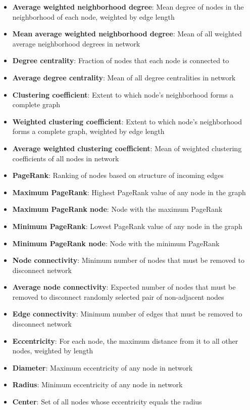 \documentclass[12pt, letterpaper]{article}
\begin{document}
\begin{itemize}
		\item \textbf{Average weighted neighborhood degree}: Mean degree of nodes in the neighborhood of each node, weighted by edge length
		\item \textbf{Mean average weighted neighborhood degree}: Mean of all weighted average neighborhood degrees in network
		\item \textbf{Degree centrality}: Fraction of nodes that each node is connected to
		\item \textbf{Average degree centrality}: Mean of all degree centralities in network
		\item \textbf{Clustering coefficient}: Extent to which node's neighborhood forms a complete graph
		\item \textbf{Weighted clustering coefficient}: Extent to which node's neighborhood forms a complete graph, weighted by edge length
		\item \textbf{Average weighted clustering coefficient}: Mean of weighted clustering coefficients of all nodes in network
		\item \textbf{PageRank}: Ranking of nodes based on structure of incoming edges
		\item \textbf{Maximum PageRank}: Highest PageRank value of any node in the graph
		\item \textbf{Maximum PageRank node}: Node with the maximum PageRank
		\item \textbf{Minimum PageRank}: Lowest PageRank value of any node in the graph
		\item \textbf{Minimum PageRank node}: Node with the minimum PageRank
		\item \textbf{Node connectivity}: Minimum number of nodes that must be removed to disconnect network
		\item \textbf{Average node connectivity}: Expected number of nodes that must be removed to	disconnect randomly selected pair of non-adjacent nodes
		\item \textbf{Edge connectivity}: Minimum number of edges that must be removed to disconnect network
		\item \textbf{Eccentricity}: For each node, the maximum distance from it to all	other nodes, weighted by length
		\item \textbf{Diameter}: Maximum eccentricity of any node in network
		\item \textbf{Radius}: Minimum eccentricity of any node in network
		\item \textbf{Center}: Set of all nodes whose eccentricity equals the radius

\end{itemize}
\end{document}
